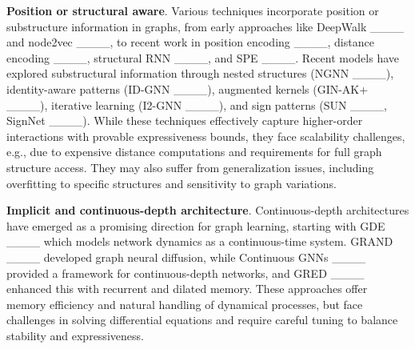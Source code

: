 {\bf{Position or structural aware}}. Various techniques incorporate position or substructure information in graphs, from early approaches like DeepWalk ____ and node2vec ____, to recent work in position encoding ____, distance encoding ____, structural RNN ____, and SPE ____. Recent models have explored substructural information through nested structures (NGNN ____), identity-aware patterns (ID-GNN ____), augmented kernels (GIN-AK+ ____), iterative learning (I2-GNN ____), and sign patterns (SUN ____, SignNet ____). While these techniques effectively capture higher-order interactions with provable expressiveness bounds, they face scalability challenges, e.g., due to expensive distance computations and requirements for full graph structure access. They may also suffer from generalization issues, including overfitting to specific structures and sensitivity to graph variations.

{\bf{Implicit and continuous-depth architecture}}. Continuous-depth architectures have emerged as a promising direction for graph learning, starting with GDE ____ which models network dynamics as a continuous-time system. GRAND ____ developed graph neural diffusion, while Continuous GNNs ____ provided a framework for continuous-depth networks, and GRED ____ enhanced this with recurrent and dilated memory. These approaches offer memory efficiency and natural handling of dynamical processes, but face challenges in solving differential equations and require careful tuning to balance stability and expressiveness.